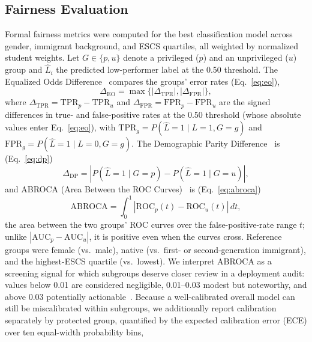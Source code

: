 \documentclass[journal]{IEEEtran}
\begin{document}
\subsection{Fairness Evaluation}
Formal fairness metrics were computed for the best classification model across gender, immigrant background, and ESCS quartiles, all weighted by normalized student weights. Let $G \in \{p, u\}$ denote a privileged ($p$) and an unprivileged ($u$) group and $\widehat{L}_i$ the predicted low-performer label at the 0.50 threshold. The Equalized Odds Difference~\cite{Hardt_2016} compares the groups' error rates (Eq.~\eqref{eq:eo}),
\begin{equation}
\Delta_{\mathrm{EO}} = \max\{|\Delta_{\mathrm{TPR}}|, |\Delta_{\mathrm{FPR}}|\},
\label{eq:eo}
\end{equation}
where $\Delta_{\mathrm{TPR}} = \mathrm{TPR}_p - \mathrm{TPR}_u$ and $\Delta_{\mathrm{FPR}} = \mathrm{FPR}_p - \mathrm{FPR}_u$ are the signed differences in true- and false-positive rates at the 0.50 threshold (whose absolute values enter Eq.~\eqref{eq:eo}), with $\mathrm{TPR}_g = P(\widehat{L}=1 \mid L=1, G=g)$ and $\mathrm{FPR}_g = P(\widehat{L}=1 \mid L=0, G=g)$. The Demographic Parity Difference~\cite{Dwork_2012} is (Eq.~\eqref{eq:dp})
\begin{equation}
\Delta_{\mathrm{DP}} = \left| P(\widehat{L}=1 \mid G=p) - P(\widehat{L}=1 \mid G=u) \right|,
\label{eq:dp}
\end{equation}
and ABROCA (Area Between the ROC Curves)~\cite{gardner2019slicing} is (Eq.~\eqref{eq:abroca})
\begin{equation}
\mathrm{ABROCA} = \int_0^1 \left| \mathrm{ROC}_p(t) - \mathrm{ROC}_u(t) \right| \, dt,
\label{eq:abroca}
\end{equation}
the area between the two groups' ROC curves over the false-positive-rate range $t$; unlike $|\mathrm{AUC}_p - \mathrm{AUC}_u|$, it is positive even when the curves cross. Reference groups were female (vs.\ male), native (vs.\ first- or second-generation immigrant), and the highest-ESCS quartile (vs.\ lowest). We interpret ABROCA as a screening signal for which subgroups deserve closer review in a deployment audit: values below 0.01 are considered negligible, 0.01--0.03 modest but noteworthy, and above 0.03 potentially actionable~\cite{Gandara_2024_blackbox,Verger_2024_MADD}. Because a well-calibrated overall model can still be miscalibrated within subgroups, we additionally report calibration separately by protected group, quantified by the expected calibration error (ECE) over ten equal-width probability bins,
\end{document}
